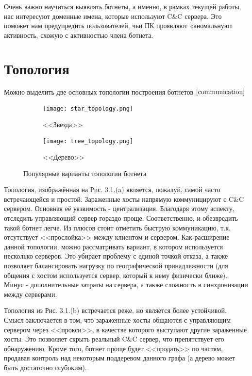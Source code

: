\documentclass[14pt]{extreport}
\begin{document}
	Очень важно научиться выявлять ботнеты, а именно, в рамках текущей
работы, нас интересуют доменные имена, которые используют C\&C сервера.
Это поможет нам предупредить пользователей, чьи ПК проявляют
«аномальную» активность, схожую с активностью члена ботнета.
	
	\newpage
	\section{Топология}
	Можно выделить две основных топологии построения ботнетов $\cite{communication}$
	

	\begin{figure}[H]
	
	\begin{subfigure}{0.5\textwidth}
	\texttt{[image: star\_topology.png]}
	\caption{<<Звезда>>}
	\label{fig:subim1}
	\end{subfigure}
	\begin{subfigure}{0.5\textwidth}
	\texttt{[image: tree\_topology.png]}
	\caption{<<Дерево>>}
	\label{fig:subim2}
	\end{subfigure}
	 
	\caption{Популярные варианты топологии ботнета}
	\label{fig:image2}
	\end{figure}
	Топология, изображённая на Рис. 3.1.(a) является, пожалуй, самой часто встречающейся и простой. Зараженные хосты напрямую коммуницируют с C\&C сервером. Основная её уязвимость - централизация. Благодаря этому аспекту, отследить управляющий сервер гораздо проще. Соответственно, и обезвредить такой ботнет легче. Из плюсов стоит отметить быструю коммуникацию, т.к. отсутствует <<прослойка>> между клиентом и сервером.
	Как расширение данной топологии, можно рассматривать вариант, в котором используется несколько серверов. Это убирает проблему с единой точкой отказа, а также позволяет балансировать нагрузку по географической принадлежности (для общения с хостом используется сервер, который к нему физически ближе). Минус - дополнительные затраты на сервера, а также сложность в синхронизации между серверами.
	
	Топология из Рис. 3.1.(b) встречается реже, но является более устойчивой. Смысл заключается в том, что зараженные хосты общаются с управляющим сервером через <<прокси>>, в качестве которого выступают другие зараженные хосты. Это позволяет скрыть реальный C\&C сервер, что препятствует его обнаружению. Кроме того, ботнет проще будет <<продать>> по частям, продавая контроль над некоторым поддеревом данного графа (а дерево может быть достаточно глубоким).
	
\end{document}
